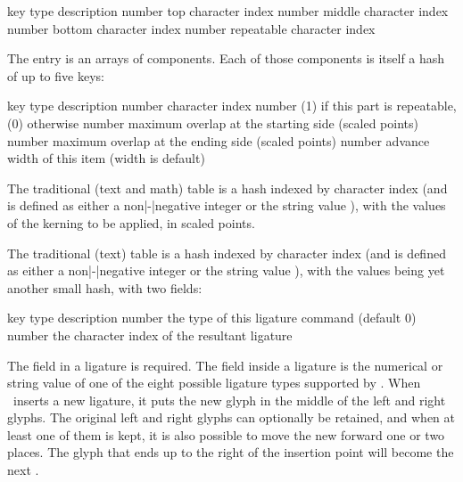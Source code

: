 {\starttabulate[|l|l|p|]
\FL
\BC key        \BC type   \BC description                \NC \NR
\ML
\NC {} \NC number \NC top character index        \NC \NR
\NC {} \NC number \NC middle character index     \NC \NR
\NC {} \NC number \NC bottom character index     \NC \NR
\NC {} \NC number \NC repeatable character index \NC \NR
\LL
\stoptabulate

The  entry is an arrays of components. Each of those components is
itself a hash of up to five keys:

\starttabulate[|l|l|p|]
\FL
\BC key             \BC type   \BC description                                          \NC \NR
\ML
\NC {}    \NC number \NC character index                                      \NC \NR
\NC {} \NC number \NC (1) if this part is repeatable, (0) otherwise        \NC \NR
\NC {}    \NC number \NC maximum overlap at the starting side (scaled points) \NC \NR
\NC {}      \NC number \NC maximum overlap at the ending side (scaled points)   \NC \NR
\NC {}  \NC number \NC advance width of this item (width is default)        \NC \NR
\LL
\stoptabulate

The traditional (text and math)  table is a hash indexed by
character index (and  is defined as either a
non|-|negative integer or the string value ), with the
values of the kerning to be applied, in scaled points.

The traditional (text)  table is a hash indexed by character
index (and  is defined as either a non|-|negative integer
or the string value ), with the values being yet another
small hash, with two fields:

\starttabulate[|l|l|p|]
\FL
\BC key         \BC type   \BC description                                   \NC \NR
\ML
\NC {} \NC number \NC the type of this ligature command (default 0) \NC \NR
\NC {} \NC number \NC the character index of the resultant ligature \NC \NR
\LL
\stoptabulate

The  field in a ligature is required. The  field inside a
ligature is the numerical or string value of one of the eight possible ligature
types supported by \TEX. When \TEX\ inserts a new ligature, it puts the new glyph
in the middle of the left and right glyphs. The original left and right glyphs
can optionally be retained, and when at least one of them is kept, it is also
possible to move the new  forward one or two places. The
glyph that ends up to the right of the insertion point will become the next
.

}
